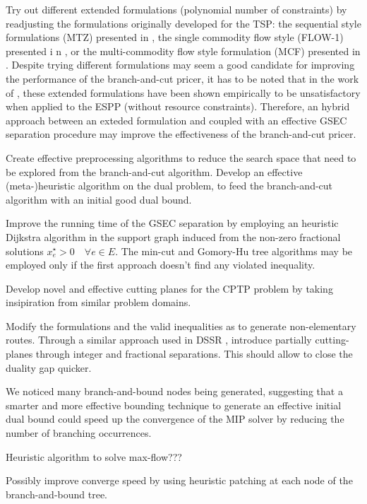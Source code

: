Try out different extended formulations (polynomial number of constraints)
by readjusting the formulations originally developed for the TSP:
the sequential style formulations (MTZ) presented in \textcite{miller1960},
the single commodity flow style (FLOW-1) presented i n \textcite{gavish1978travelling},
or the multi-commodity flow style formulation (MCF) presented in \textcite{wong1980integer,claus1984new}.
Despite trying different formulations may seem a good candidate for improving
the performance of the branch-and-cut pricer,
it has to be noted that in the work of \textcite{taccari2016},
these extended formulations have been shown empirically
to be unsatisfactory when applied to the ESPP (without resource constraints).
Therefore, an hybrid approach between an exteded formulation
and coupled with an effective GSEC separation procedure may improve
the effectiveness of the branch-and-cut pricer.

Create effective preprocessing algorithms to reduce the search space
that need to be explored from the branch-and-cut algorithm.
Develop an effective (meta-)heuristic algorithm on the dual problem,
to feed the branch-and-cut algorithm with an initial good dual bound.

Improve the running time of the GSEC separation by employing an heuristic
Dijkstra algorithm in the support graph induced from the non-zero fractional solutions $x^\star_e > 0 \quad \forall e \in E$.
The min-cut and Gomory-Hu tree algorithms may be employed only if the first approach
doesn't find any violated inequality.

Develop novel and effective cutting planes for the CPTP problem by taking
insipiration from similar problem domains.

Modify the formulations and the valid inequalities as to generate non-elementary routes.
Through a similar approach used in DSSR \parencite{boland2006, righini2008, martinelli2014},
introduce partially cutting-planes through integer and fractional separations.
This should allow to close the duality gap quicker.

\medskip

We noticed many branch-and-bound nodes being generated,
suggesting that a smarter and more effective bounding technique to
generate an effective initial dual bound could speed up the convergence
of the MIP solver by reducing the number of branching occurrences.

Heuristic algorithm to solve max-flow???

Possibly improve converge speed by using heuristic patching at each
node of the branch-and-bound tree.

